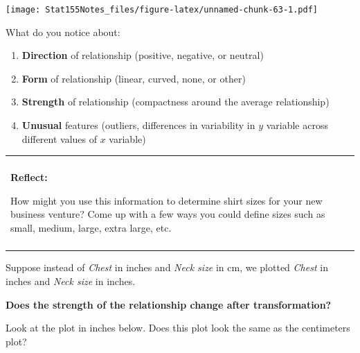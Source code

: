 \documentclass[]{book}
\newenvironment{Shaded}{\begin{snugshade}}{\end{snugshade}}
\newcommand{\DataTypeTok}[1]{\textcolor[rgb]{0.13,0.29,0.53}{#1}}
\newcommand{\KeywordTok}[1]{\textcolor[rgb]{0.13,0.29,0.53}{\textbf{#1}}}
\newcommand{\NormalTok}[1]{#1}
\newcommand{\OperatorTok}[1]{\textcolor[rgb]{0.81,0.36,0.00}{\textbf{#1}}}
\newcommand{\StringTok}[1]{\textcolor[rgb]{0.31,0.60,0.02}{#1}}
\providecommand{\tightlist}{%
  \setlength{\itemsep}{0pt}\setlength{\parskip}{0pt}}
\newenvironment{reflect}
{
    \begin{center}
    
    \begin{tabular}{|p{0.8\textwidth}|}
    \rowcolor{LightBlue}
    \hline\\
    \rowcolor{LightBlue}
    \textbf{Reflect:}
}
{
    \\\rowcolor{LightBlue}
    \\\hline
    \end{tabular} 
    \end{center}
}
\begin{document}
\begin{Shaded}
\end{Shaded}

\texttt{[image: Stat155Notes\_files/figure-latex/unnamed-chunk-63-1.pdf]}

What do you notice about:

\begin{enumerate}
\def\labelenumi{\arabic{enumi}.}
\tightlist
\item
  \textbf{Direction} of relationship (positive, negative, or neutral)
\item
  \textbf{Form} of relationship (linear, curved, none, or other)
\item
  \textbf{Strength} of relationship (compactness around the average relationship)
\item
  \textbf{Unusual} features (outliers, differences in variability in \(y\) variable across different values of \(x\) variable)
\end{enumerate}

\begin{reflect}
How might you use this information to determine shirt sizes for your new
business venture? Come up with a few ways you could define sizes such as
small, medium, large, extra large, etc.
\end{reflect}

Suppose instead of \emph{Chest} in inches and \emph{Neck size} in cm, we plotted \emph{Chest} in inches and \emph{Neck size} in inches.

\textbf{Does the strength of the relationship change after transformation?}

Look at the plot in inches below. Does this plot look the same as the centimeters plot?
\end{document}

